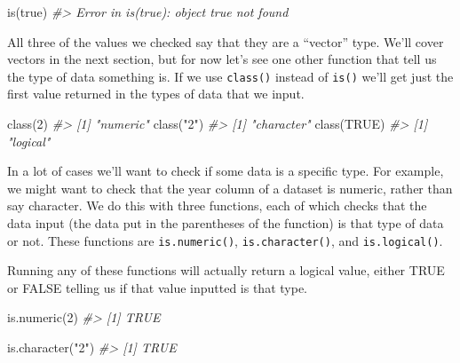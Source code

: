 \documentclass[
]{krantz}
\makeatletter
\newenvironment{Shaded}{\begin{snugshade}}{\end{snugshade}}
\newcommand{\CommentTok}[1]{\textcolor[rgb]{0.37,0.37,0.37}{\textit{#1}}}
\newcommand{\ConstantTok}[1]{\textcolor[rgb]{0,0,0}{#1}}
\newcommand{\DecValTok}[1]{\textcolor[rgb]{0.06,0.06,0.06}{#1}}
\newcommand{\FunctionTok}[1]{\textcolor[rgb]{0,0,0}{#1}}
\newcommand{\NormalTok}[1]{#1}
\newcommand{\StringTok}[1]{\textcolor[rgb]{0.5,0.5,0.5}{#1}}
\newenvironment{kframe}{%
\medskip{}
\setlength{\fboxsep}{.8em}
 \def\at@end@of@kframe{}%
 \ifinner\ifhmode%
  \def\at@end@of@kframe{\end{minipage}}%
  \begin{minipage}{\columnwidth}%
 \fi\fi%
 \def\FrameCommand##1{\hskip\@totalleftmargin \hskip-\fboxsep
 \colorbox{shadecolor}{##1}\hskip-\fboxsep
     \hskip-\linewidth \hskip-\@totalleftmargin \hskip\columnwidth}%
 \MakeFramed {\advance\hsize-\width
   \@totalleftmargin\z@ \linewidth\hsize
   \@setminipage}}%
 {\par\unskip\endMakeFramed%
 \at@end@of@kframe}
\renewenvironment{Shaded}{\begin{kframe}}{\end{kframe}}
\makeatother
\begin{document}
\begin{Shaded}
\begin{Highlighting}[]
\FunctionTok{is}\NormalTok{(true)}
\CommentTok{\#\textgreater{} Error in is(true): object \textquotesingle{}true\textquotesingle{} not found}
\end{Highlighting}
\end{Shaded}

All three of the values we checked say that they are a ``vector'' type. We'll cover vectors in the next section, but for now let's see one other function that tell us the type of data something is. If we use \texttt{class()} instead of \texttt{is()} we'll get just the first value returned in the types of data that we input.

\begin{Shaded}
\begin{Highlighting}[]
\FunctionTok{class}\NormalTok{(}\DecValTok{2}\NormalTok{)}
\CommentTok{\#\textgreater{} [1] "numeric"}
\FunctionTok{class}\NormalTok{(}\StringTok{"2"}\NormalTok{)}
\CommentTok{\#\textgreater{} [1] "character"}
\FunctionTok{class}\NormalTok{(}\ConstantTok{TRUE}\NormalTok{)}
\CommentTok{\#\textgreater{} [1] "logical"}
\end{Highlighting}
\end{Shaded}

In a lot of cases we'll want to check if some data is a specific type. For example, we might want to check that the year column of a dataset is numeric, rather than say character. We do this with three functions, each of which checks that the data input (the data put in the parentheses of the function) is that type of data or not. These functions are \texttt{is.numeric()}, \texttt{is.character()}, and \texttt{is.logical()}.

Running any of these functions will actually return a logical value, either TRUE or FALSE telling us if that value inputted is that type.

\begin{Shaded}
\begin{Highlighting}[]
\FunctionTok{is.numeric}\NormalTok{(}\DecValTok{2}\NormalTok{)}
\CommentTok{\#\textgreater{} [1] TRUE}
\end{Highlighting}
\end{Shaded}

\begin{Shaded}
\begin{Highlighting}[]
\FunctionTok{is.character}\NormalTok{(}\StringTok{"2"}\NormalTok{)}
\CommentTok{\#\textgreater{} [1] TRUE}
\end{Highlighting}
\end{Shaded}
\end{document}
